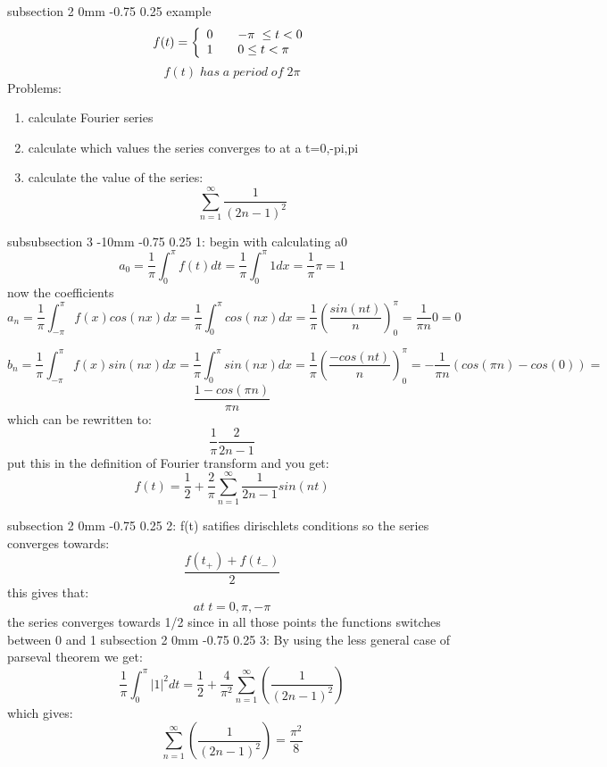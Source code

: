 \documentclass[a4paper,11pt]{article}
\makeatletter
\renewcommand{\subsection}{\@startsection
   {subsection}%
   {2}%
   {0mm}%
   {-0.75\baselineskip}%
   {0.25\baselineskip}%
   {\rmfamily\normalfont\slshape\normalsize}}%
\renewcommand{\subsubsection}{\@startsection
   {subsubsection}%
   {3}%
   {-10mm}%
   {-0.75\baselineskip}%
   {0.25\baselineskip}%
   {\rmfamily\normalfont\slshape\normalsize}}%
\makeatother
\begin{document}
\subsection{example}
\[ f(t) = \left\{
  \begin{array}{l l}
    0 & \quad -\pi \; \leq t<0\\
    1 & \quad 0\leq t<\pi 
  \end{array} \right.\]
  $$f(t) \;has\;a\;period\;of\;2\pi$$
Problems:
\begin{enumerate}
\item calculate Fourier series
\item calculate which values the series converges to at a t=0,-pi,pi
\item calculate the value of the series:$$\sum_{n=1}^{\infty}\dfrac{1}{(2n-1)^2}$$

\end{enumerate}
\subsubsection{1:}
begin with calculating a0
$$a_0=\dfrac{1}{\pi}\int_{0}^{\pi}f(t)dt=\dfrac{1}{\pi}\int_{0}^{\pi}1dx=\dfrac{1}{\pi}\pi=1$$
now the coefficients
$$a_n=\dfrac{1}{\pi}\int_{-\pi}^{\pi}f(x)cos(nx)dx=\dfrac{1}{\pi}\int_{0}^{\pi}cos(nx)dx=\dfrac{1}{\pi}\left(\dfrac{sin(nt)}{n}\right)_{0}^{\pi}=\dfrac{1}{\pi n}0=0$$

$$b_n=\dfrac{1}{\pi}\int_{-\pi}^{\pi}f(x)sin(nx)dx=\dfrac{1}{\pi}\int_{0}^{\pi}sin(nx)dx=\dfrac{1}{\pi}\left(\dfrac{-cos(nt)}{n}\right)_{0}^{\pi}=-\dfrac{1}{\pi n}(cos(\pi n)-cos(0))=$$
$$\dfrac{1-cos(\pi n)}{\pi n}$$
which can be rewritten to:
$$\dfrac{1}{\pi}\dfrac{2}{2n-1}$$
put this in the definition of Fourier transform and you get:
$$f(t)=\dfrac{1}{2}+\dfrac{2}{\pi}\sum_{n=1}^{\infty}\dfrac{1}{2n-1}sin(nt)$$

\subsection{2:}
f(t) satifies dirischlets conditions so the series converges towards:
$$\dfrac{f(t_+)+f(t_-)}{2}$$ 
this gives that:
$$at \; t=0,\pi,-\pi$$
the series converges towards 1/2 since in all those points the functions switches between 0 and 1
\subsection{3:}
By using the less general case of parseval theorem we get:
$$\dfrac{1}{\pi}\int_{0}^{\pi}|1|^2dt=\dfrac{1}{2}+\dfrac{4}{\pi^2}\sum_{n=1}^{\infty}(\dfrac{1}{(2n-1)^2})$$
which gives:
$$\sum_{n=1}^{\infty}(\dfrac{1}{(2n-1)^2})=\dfrac{\pi^2}{8}$$
\end{document}
